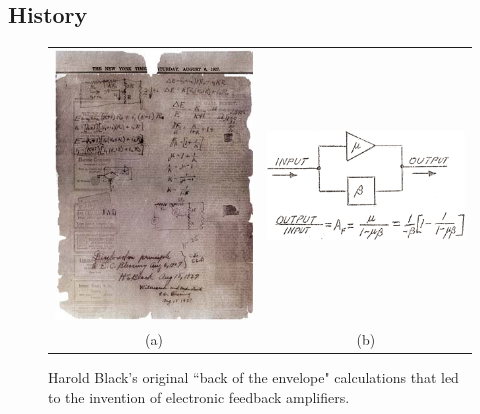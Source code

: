 \subsection{History}
\begin{figure}[tb]
\begin{center}
\begin{tabular}{cc}
\includegraphics[width=.6\columnwidth]{image_1.jpg} &
\includegraphics[width=.4\columnwidth]{image_2.png} \\
(a) & (b) \\
\end{tabular}
\end{center}
\caption{Harold Black's original ``back of the envelope" calculations that led to the invention of electronic feedback amplifiers.}
\label{fig:image_1.jpg}
\end{figure}

